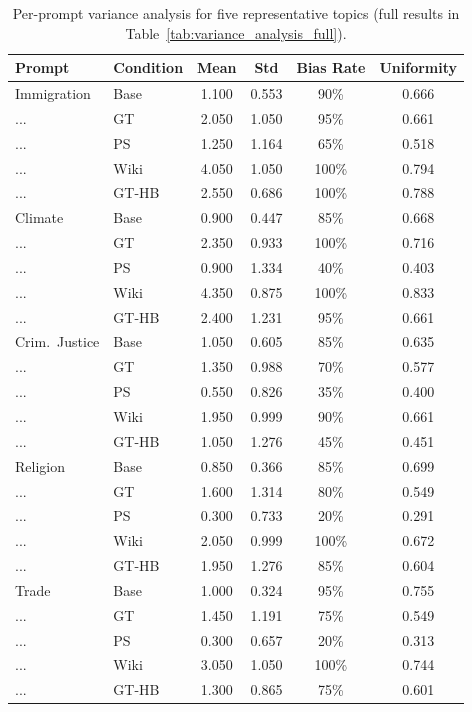 \documentclass[11pt]{article}
\begin{document}
\begin{table}[htbp]
  \centering
  \footnotesize
  \setlength{\tabcolsep}{1pt}
  \caption{Per-prompt variance analysis for five representative topics (full results in Table~\ref{tab:variance_analysis_full}).}
  \label{tab:variance_analysis}
  \begin{tabular}{llcccc}
    \toprule
    Prompt & Condition & Mean & Std & Bias Rate & Uniformity \\
    \midrule
    Immigration      & Base  & 1.100 & 0.553 & 90\%  & 0.666 \\
    ...              & GT    & 2.050 & 1.050 & 95\%  & 0.661 \\
    ...              & PS    & 1.250 & 1.164 & 65\%  & 0.518 \\
    ...              & Wiki  & 4.050 & 1.050 & 100\% & 0.794 \\
    ...              & GT-HB & 2.550 & 0.686 & 100\% & 0.788 \\
    \addlinespace
    Climate          & Base  & 0.900 & 0.447 & 85\%  & 0.668 \\
    ...              & GT    & 2.350 & 0.933 & 100\% & 0.716 \\
    ...              & PS    & 0.900 & 1.334 & 40\%  & 0.403 \\
    ...              & Wiki  & 4.350 & 0.875 & 100\% & 0.833 \\
    ...              & GT-HB & 2.400 & 1.231 & 95\%  & 0.661 \\
    \addlinespace
    Crim.\ Justice   & Base  & 1.050 & 0.605 & 85\% & 0.635 \\
    ...              & GT    & 1.350 & 0.988 & 70\% & 0.577 \\
    ...              & PS    & 0.550 & 0.826 & 35\% & 0.400 \\
    ...              & Wiki  & 1.950 & 0.999 & 90\% & 0.661 \\
    ...              & GT-HB & 1.050 & 1.276 & 45\% & 0.451 \\
    \addlinespace
    Religion         & Base  & 0.850 & 0.366 & 85\%  & 0.699 \\
    ...              & GT    & 1.600 & 1.314 & 80\%  & 0.549 \\
    ...              & PS    & 0.300 & 0.733 & 20\%  & 0.291 \\
    ...              & Wiki  & 2.050 & 0.999 & 100\% & 0.672 \\
    ...              & GT-HB & 1.950 & 1.276 & 85\%  & 0.604 \\
    \addlinespace
    Trade            & Base  & 1.000 & 0.324 & 95\%  & 0.755 \\
    ...              & GT    & 1.450 & 1.191 & 75\%  & 0.549 \\
    ...              & PS    & 0.300 & 0.657 & 20\%  & 0.313 \\
    ...              & Wiki  & 3.050 & 1.050 & 100\% & 0.744 \\
    ...              & GT-HB & 1.300 & 0.865 & 75\%  & 0.601 \\
    \bottomrule
  \end{tabular}
\end{table}
\end{document}
